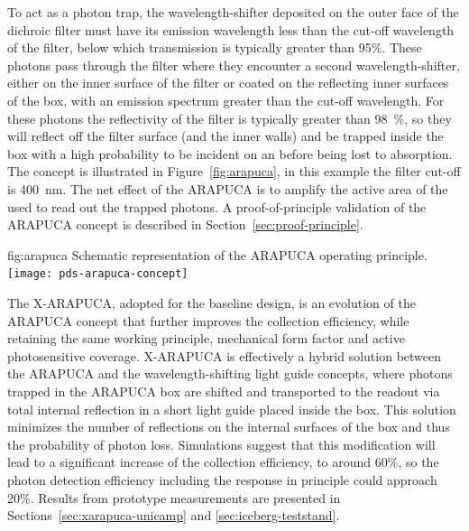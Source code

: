 To act as a photon trap, the wavelength-shifter deposited on the outer face of the dichroic filter must have its emission wavelength less than the cut-off wavelength of the filter, below which transmission is typically greater than 95\%. These photons pass through the filter where they encounter a second wavelength-shifter, either on the inner surface of the filter or coated on the reflecting inner surfaces of the box, with an emission spectrum greater than the cut-off wavelength. For these photons the reflectivity of the filter is typically greater than \SI{98}{\%}, so they will reflect off the filter surface (and the inner walls) and be trapped inside the box with a high probability to be incident on an  before being lost to absorption. The concept is illustrated in Figure~\ref{fig:arapuca}, in this example the filter cut-off is \SI{400}{nm}.
The net effect of the ARAPUCA is to amplify the active area of the  used to read out the trapped photons. A proof-of-principle validation of the ARAPUCA concept is described in Section~\ref{sec:proof-principle}.

\begin{dunefigure}{fig:arapuca}
{Schematic representation of the ARAPUCA operating principle.}
\texttt{[image: pds-arapuca-concept]}   
\end{dunefigure}

The X-ARAPUCA, adopted for the baseline design, is an evolution of the ARAPUCA concept that further improves the collection efficiency, while retaining the same working principle, mechanical form factor and active photosensitive coverage. X-ARAPUCA is effectively a hybrid solution between the ARAPUCA and the wavelength-shifting light guide concepts, where photons trapped in the ARAPUCA box are shifted and transported to the readout via total internal reflection in a short light guide placed inside the box.
This solution minimizes the number of reflections on the internal surfaces of the box and thus the probability of photon loss. Simulations suggest that this modification will lead to a significant increase of the collection efficiency, to around 60\%, so the photon detection efficiency including the  response in principle could approach 20\%. Results from prototype measurements are presented in Sections~\ref{sec:xarapuca-unicamp} and \ref{sec:iceberg-teststand}.

